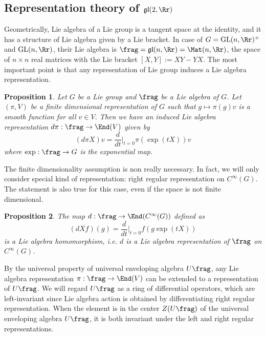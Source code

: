 \documentclass{article}
\newcommand{\GL}{\mathrm{GL}}
\newtheorem{proposition}{Proposition}[section]
\begin{document}
\subsection{Representation theory of $\mathfrak{gl}(2, \Rr)$}
Geometrically, Lie algebra of a Lie group is a tangent space at the identity, and it has a structure of Lie algebra given by a Lie bracket. In case of $G = \GL(n, \Rr)^{+}$ and $\GL(n, \Rr)$, their Lie algebra is $\frag = \mathfrak{gl}(n, \Rr) = \Mat(n, \Rr)$, the space of $n\times n$ real matrices with the Lie bracket $[X, Y]:= XY - YX$. The most important point is that any representation of Lie group induces a Lie algebra representation. 
\begin{proposition}
Let $G$ be a Lie group and $\frag$ be a Lie algebra of $G$. Let $(\pi, V)$ be a finite dimensional representation of $G$ such that $g\mapsto \pi(g)v$ is a smooth function for all $v\in V$. Then we have an induced Lie algebra representation $d\pi:\frag\to \End(V)$ given by 
$$
(d\pi X)v = \frac{d}{dt}\Big|_{t=0} \pi(\exp(tX))v
$$
where $\exp:\frag \to G$ is the exponential map. 
\end{proposition}
The finite dimensionality assumption is non really necessary. 
In fact, we will only consider special kind of representation: right regular representation on $C^{\infty}(G)$. 
The statement is also true for this case, even if the space is not finite dimensional.
\begin{proposition}
The map $d:\frag \to \End(C^{\infty}(G))$ defined as 
$$
(dXf)(g) = \frac{d}{dt}\Big|_{t=0} f(g\exp(tX))
$$
is a Lie algebra homomorphism, i.e. $d$ is a Lie algebra representation of $\frag$ on $C^{\infty}(G)$. 
\end{proposition}

By the universal property of universal enveloping algebra $U\frag$, any Lie algebra representation $\pi:\frag \to \End(V)$ can be extended to a representation of $U\frag$. 
We will regard $U\frag$ as a ring of differential operators, which are left-invariant since Lie algebra action is obtained by differentiating right regular representation. 
When the element is in the center $Z(U\frag)$ of the universal enveloping algebra $U\frag$, it is both  invariant under the left and right regular representations.
\end{document}
